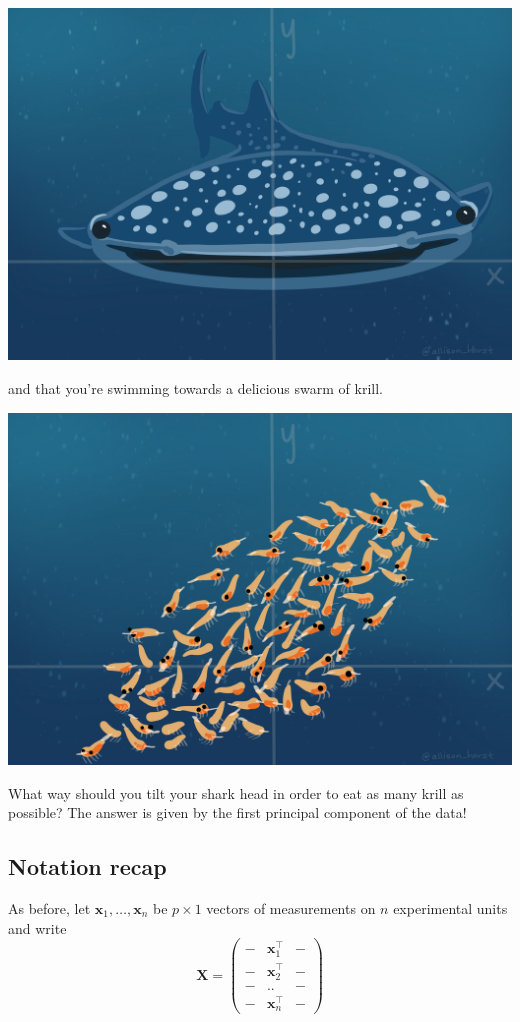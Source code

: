 \documentclass[]{book}
\theoremstyle{definition}
\theoremstyle{definition}
\theoremstyle{definition}
\theoremstyle{remark}
\begin{document}
\includegraphics{figs/WideMouthShark1.png}

and that you're swimming towards a delicious swarm of krill.

\includegraphics{figs/WideMouthShark2.png}

What way should you tilt your shark head in order to eat as many krill as possible? The answer is given by the first principal component of the data!

\hypertarget{notation-recap}{%
\subsection{Notation recap}\label{notation-recap}}

As before, let \(\mathbf x_1,\ldots,\mathbf x_n\) be \(p \times 1\) vectors of measurements on \(n\) experimental units and write
\[\mathbf X=\left( \begin{array}{ccc}
- &\mathbf x_1^\top&-\\
- &\mathbf x_2^\top&-\\
- &..&-\\
- &\mathbf x_n^\top&-
\end{array}\right)
\]
\end{document}
